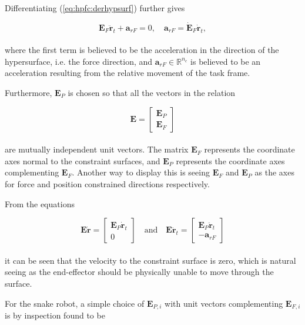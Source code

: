 Differentiating (\ref{eq:hpfc:derhypsurf}) further gives

\begin{equation}\label{eq:dhpfc_arf}
    \mathbf{E}_F \mathbf{\ddot{r}}_t + \mathbf{a}_{r F} = 0, \quad \mathbf{a}_{r F} = \mathbf{\dot{E}}_F\mathbf{\dot{r}}_t,
\end{equation}
\\
where the first term is believed to be the acceleration in the direction of the hypersurface, i.e. the force direction, and $\mathbf{a}_{r F} \in \mathbb{R}^{n_c}$ is believed to be an acceleration resulting from the relative movement of the task frame.

Furthermore, $\mathbf{E}_P$ is chosen so that all the vectors in the relation

\begin{equation}\label{eq:dhpfc_E}
    \mathbf{E} =
    \begin{bmatrix}
    \mathbf{E}_P \\ \mathbf{E}_F
    \end{bmatrix}
\end{equation}
\\
are mutually independent unit vectors. The matrix $\mathbf{E}_F$ represents the coordinate axes normal to the constraint surfaces, and $\mathbf{E}_P$ represents the coordinate axes complementing $\mathbf{E}_F$. Another way to display this is seeing $\mathbf{E}_F$ and $\mathbf{E}_P$ as the axes for force and position constrained directions respectively.

From the equations

\begin{equation}
    \mathbf{E\dot{r}} =
    \begin{bmatrix}
        \mathbf{E}_P \mathbf{\dot{r}}_t\\
        0
    \end{bmatrix}
    \quad \text{and} \quad
    \mathbf{E\ddot{r}}_t =
    \begin{bmatrix}
        \mathbf{E}_P \mathbf{\ddot{r}}_t \\
        -\mathbf{a}_{r F}
    \end{bmatrix}
\end{equation}
\\
it can be seen that the velocity to the constraint surface is zero, which is natural seeing as the end-effector should be physically unable to move through the surface.

For the snake robot, a simple choice of $\mathbf{E}_{P,i}$ with unit vectors complementing $\mathbf{E}_{F,i}$ is by inspection found to be

